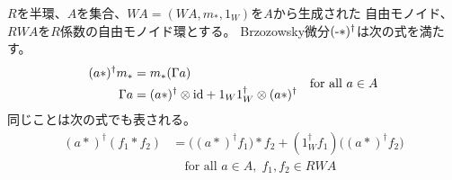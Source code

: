 		\begin{proposition}[Brzozowsky微分の積との交換関係]\label{prop:Brzozowsky微分の積との交換関係} %
			$R$を半環、$A$を集合、$WA=(WA,m_*,1_W)$を$A$から生成された
			自由モノイド、$RWA$を$R$係数の自由モノイド環とする。
			Brzozowsky微分$(\myhere*)^\dag$は次の式を満たす。
			\begin{equation*} %
				\begin{split}
					(a*)^\dag m_* &= m_*(\Gamma a) \\
					\Gamma a &= (a*)^\dag\otimes \myid + 1_W1_W^\dag
						\otimes (a*)^\dag
				\end{split} \quad\text{for all }a\in A
			\end{equation*} %
			同じことは次の式でも表される。
			\begin{equation*}\begin{split} %
				(a*)^\dag(f_1*f_2) &= \bigl((a*)^\dag f_1\bigr)*f_2 
					+ (1_W^\dag f_1)\bigl((a*)^\dag f_2\bigr) \\
				&\quad\text{for all }a\in A,\;f_1,f_2\in RWA
			\end{split}\end{equation*} %
		\end{proposition} %


